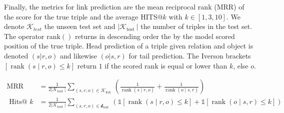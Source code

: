 Finally, the metrics for link prediction are the mean reciprocal rank (MRR) of the score for the true triple and the average HITS@$k$ with $k \in [1,3,10]$. We denote $\mathcal{K}_{test}$ the unseen test set and $\left|\mathcal{K}_{\text {test }}\right|$ the number of triples in the test set. The operator $\operatorname{rank()}$ returns in descending order the by the model scored position of the true triple. Head prediction of a triple given relation and object is denoted $(s|r,o)$ and likewise $(o|s,r)$ for tail prediction. The Iverson brackets $[\operatorname{rank}(s \mid r, o) \leq k]$ return $1$ if the scored rank is equal or lower than $k$, else $o$. 


\begin{equation}
    \begin{aligned}
    \operatorname{MRR} &=\frac{1}{2\left|\mathcal{K}_{\text {test }}\right|} \sum_{(s, r, o) \in \mathcal{K}_{\text {lest }}}\left(\frac{1}{\operatorname{rank}(s \mid r, o)}+\frac{1}{\operatorname{rank}(o \mid s, r)}\right) \\
    \text { Hits@ } k &=\frac{1}{2\left|\mathcal{K}_{\text {test }}\right|} \sum_{(s, r, o) \in \mathcal{k}_{\text {lest }}}(\mathbb{1}[\operatorname{rank}(s \mid r, o) \leq k]+\mathbb{1}[\operatorname{rank}(o \mid s, r) \leq k])
    \end{aligned}
\label{eq4:MRR}
\end{equation}







